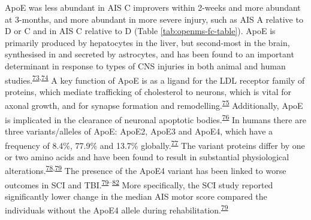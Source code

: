\documentclass[
]{article}
\begin{document}
ApoE was less abundant in AIS C improvers within 2-weeks and more abundant at 3-months, and more abundant in more severe injury, such as AIS A relative to D or C and in AIS C relative to D (Table \ref{tab:openms-fc-table}).
ApoE is primarily produced by hepatocytes in the liver, but second-most in the brain, synthesised in and secreted by astrocytes, and has been found to an important determinant in response to types of CNS injuries in both animal and human studies.\textsuperscript{\protect\hyperlink{ref-teasdale_association_1997}{73},\protect\hyperlink{ref-poirier_apolipoprotein_1994}{74}}
A key function of ApoE is as a ligand for the LDL receptor family of proteins, which mediate trafficking of cholesterol to neurons, which is vital for axonal growth, and for synapse formation and remodelling.\textsuperscript{\protect\hyperlink{ref-xu_interactions_2014}{75}}
Additionally, ApoE is implicated in the clearance of neuronal apoptotic bodies.\textsuperscript{\protect\hyperlink{ref-elliott_apoptosis_2007}{76}}
In humans there are three variants/alleles of ApoE: ApoE2, ApoE3 and ApoE4, which have a frequency of 8.4\%, 77.9\% and 13.7\% globally.\textsuperscript{\protect\hyperlink{ref-liu_apolipoprotein_2013}{77}}
The variant proteins differ by one or two amino acids and have been found to result in substantial physiological alterations.\textsuperscript{\protect\hyperlink{ref-mahley_apolipoprotein_2000}{78},\protect\hyperlink{ref-jha_apolipoprotein_2008}{79}}
The presence of the ApoE4 variant has been linked to worse outcomes in SCI and TBI.\textsuperscript{\protect\hyperlink{ref-jha_apolipoprotein_2008}{79}--\protect\hyperlink{ref-friedman_apolipoprotein_1999}{82}}
More specifically, the SCI study reported significantly lower change in the median AIS motor score compared the individuals without the ApoE4 allele during rehabilitation.\textsuperscript{\protect\hyperlink{ref-jha_apolipoprotein_2008}{79}}
\end{document}
